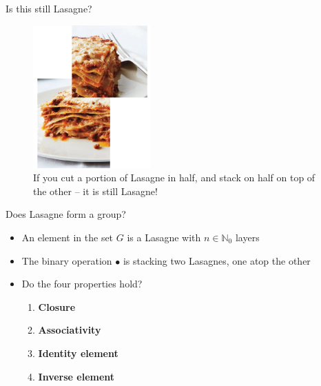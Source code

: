 \documentclass{beamer}
\begin{document}
\begin{frame}{Is this still Lasagne?}
    \begin{figure}
        \includegraphics[width=0.4\textwidth]{lasagne_stacked.png}
        \caption{\label{fig:lasagane-stacked}If you cut a portion of Lasagne in half, and stack on half on top of the other -- it is still Lasagne!}
    \end{figure}
\end{frame}

\begin{frame}{Does Lasagne form a group?}
    \begin{itemize}
        \item An element in the set $G$ is a Lasagne with $n \in \mathbb{N}_{0}$ layers
        \item The binary operation $\bullet$ is stacking two Lasagnes, one atop the other
        \vskip 1cm
        \item Do the four properties hold?
        \begin{enumerate}
            \item \textbf{Closure}
            \item \textbf{Associativity}
            \item \textbf{Identity element}
            \item \textbf{Inverse element}
        \end{enumerate}
    \end{itemize}
\end{frame}
\end{document}
